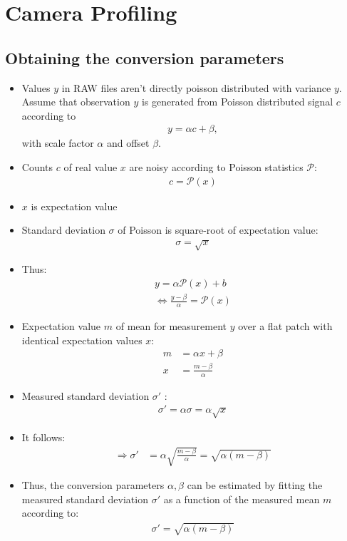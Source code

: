 \documentclass[]{article}
\begin{document}
\section{Camera Profiling}
\subsection{Obtaining the conversion parameters}
\begin{itemize}
	\item Values $y$ in RAW files aren't directly poisson distributed with variance $y$. Assume that observation $y$ is generated from Poisson distributed signal $c$ according to
	\begin{align}
		y = \alpha c + \beta,
	\end{align}
	with scale factor $\alpha$ and offset $\beta$.
	\item Counts $c$ of real value $x$ are noisy according to Poisson statistics $\mathcal{P}$:
	\begin{align}
		c = \mathcal{P}(x)
	\end{align}
	\item $x$ is expectation value
	\item Standard deviation $\sigma$ of Poisson is square-root of expectation value:
	\begin{align}
		\sigma = \sqrt{x}
	\end{align}
	\item Thus:
	\begin{align}
		y = \alpha \mathcal{P}(x) + b\\
		\Leftrightarrow \frac{y - \beta}{\alpha} = \mathcal{P}(x) 
	\end{align}
	\item Expectation value $m$ of mean for measurement $y$ over a flat patch with identical expectation values $x$:
	\begin{align}
		m &= \alpha x + \beta \\
		x &= \frac{m - \beta}{\alpha} 
	\end{align}
	\item Measured standard deviation $\sigma'$ :
	\begin{align}
		\sigma' = \alpha \sigma = \alpha \sqrt{x}
	\end{align}
	\item It follows:
	\begin{align}
		\Rightarrow \sigma' &= \alpha \sqrt{\frac{m - \beta}{\alpha}} = \sqrt{\alpha (m - \beta)}
	\end{align}
	\item Thus, the conversion parameters $\alpha, \beta$ can be estimated by fitting the measured standard deviation $\sigma'$ as a function of the measured mean $m$ according to:
	\begin{align}
		\sigma' = \sqrt{\alpha (m - \beta)}
	\end{align}
\end{itemize}
\end{document}
